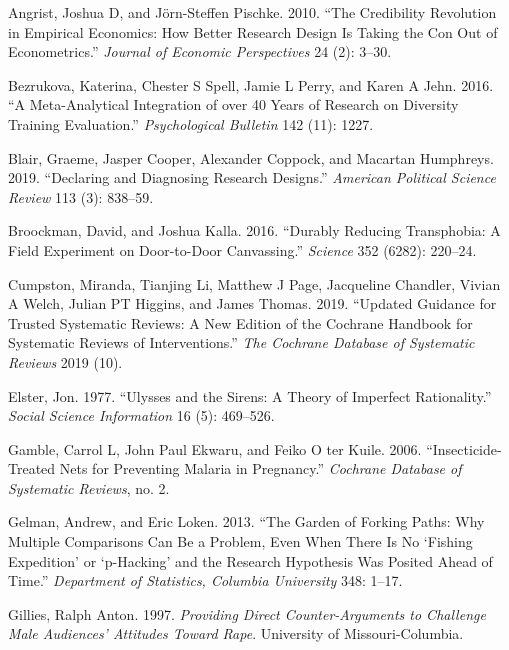 \documentclass{article}
\newlength{\cslhangindent}
\newenvironment{CSLReferences}[2] %
 {\begin{list}{}{%
  \setlength{\itemindent}{0pt}
  \setlength{\leftmargin}{0pt}
  \setlength{\parsep}{0pt}
  \ifodd #1
   \setlength{\leftmargin}{\cslhangindent}
   \setlength{\itemindent}{-1\cslhangindent}
  \fi
  \setlength{\itemsep}{#2\baselineskip}}}
 {\end{list}}
\begin{document}
\label{refs}
\begin{CSLReferences}{1}{0}
Angrist, Joshua D, and Jörn-Steffen Pischke. 2010. {``The Credibility
Revolution in Empirical Economics: How Better Research Design Is Taking
the Con Out of Econometrics.''} \emph{Journal of Economic Perspectives}
24 (2): 3--30.

Bezrukova, Katerina, Chester S Spell, Jamie L Perry, and Karen A Jehn.
2016. {``A Meta-Analytical Integration of over 40 Years of Research on
Diversity Training Evaluation.''} \emph{Psychological Bulletin} 142
(11): 1227.

Blair, Graeme, Jasper Cooper, Alexander Coppock, and Macartan Humphreys.
2019. {``Declaring and Diagnosing Research Designs.''} \emph{American
Political Science Review} 113 (3): 838--59.

Broockman, David, and Joshua Kalla. 2016. {``Durably Reducing
Transphobia: A Field Experiment on Door-to-Door Canvassing.''}
\emph{Science} 352 (6282): 220--24.

Cumpston, Miranda, Tianjing Li, Matthew J Page, Jacqueline Chandler,
Vivian A Welch, Julian PT Higgins, and James Thomas. 2019. {``Updated
Guidance for Trusted Systematic Reviews: A New Edition of the Cochrane
Handbook for Systematic Reviews of Interventions.''} \emph{The Cochrane
Database of Systematic Reviews} 2019 (10).

Elster, Jon. 1977. {``Ulysses and the Sirens: A Theory of Imperfect
Rationality.''} \emph{Social Science Information} 16 (5): 469--526.

Gamble, Carrol L, John Paul Ekwaru, and Feiko O ter Kuile. 2006.
{``Insecticide-Treated Nets for Preventing Malaria in Pregnancy.''}
\emph{Cochrane Database of Systematic Reviews}, no. 2.

Gelman, Andrew, and Eric Loken. 2013. {``The Garden of Forking Paths:
Why Multiple Comparisons Can Be a Problem, Even When There Is No
{`Fishing Expedition'} or {`p-Hacking'} and the Research Hypothesis Was
Posited Ahead of Time.''} \emph{Department of Statistics, Columbia
University} 348: 1--17.

Gillies, Ralph Anton. 1997. \emph{Providing Direct Counter-Arguments to
Challenge Male Audiences' Attitudes Toward Rape}. University of
Missouri-Columbia.


\end{CSLReferences}
\end{document}
